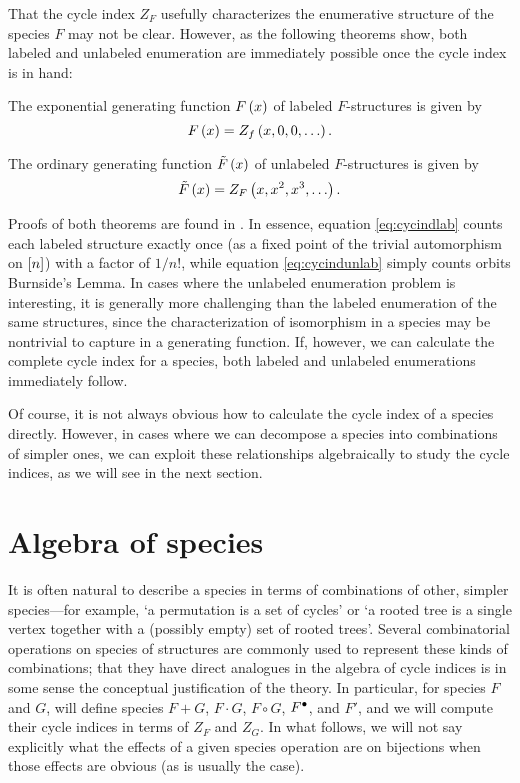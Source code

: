 \documentclass[sectionflow,singlespace,twoside,boldmathhdr]{brandiss} %
\numberwithin{section}{chapter}
\numberwithin{figure}{chapter}
\begin{document}
That the cycle index $Z_{F}$ usefully characterizes the enumerative structure of the species $F$ may not be clear.
However, as the following theorems show, both labeled and unlabeled enumeration are immediately possible once the cycle index is in hand:
\begin{theorem}\label{thm:cycindlab}
  The exponential generating function $F \left( {x} \right)$ of labeled $F$-structures is given by
  \begin{equation}\label{eq:cycindlab}
    F \left( {x} \right) = Z_{f} \left( {x, 0, 0, \dots} \right).
  \end{equation}
\end{theorem}
\begin{theorem}\label{thm:cycindunlab}
  The ordinary generating function $\tilde{F} \left( {x} \right)$ of unlabeled $F$-structures is given by
  \begin{equation}\label{eq:cycindunlab}
    \tilde{F} \left( {x} \right) = Z_{F} \left( {x, x^{2}, x^{3}, \dots} \right).
  \end{equation}
\end{theorem}
Proofs of both theorems are found in \cite[\S 1.2]{bll:species}.
In essence, equation \eqref{eq:cycindlab} counts each labeled structure exactly once (as a fixed point of the trivial automorphism on $\left[ {n} \right]$) with a factor of $1/n!$, while equation \eqref{eq:cycindunlab} simply counts orbits  Burnside's Lemma.
In cases where the unlabeled enumeration problem is interesting, it is generally more challenging than the labeled enumeration of the same structures, since the characterization of isomorphism in a species may be nontrivial to capture in a generating function.
If, however, we can calculate the complete cycle index for a species, both labeled and unlabeled enumerations immediately follow.

Of course, it is not always obvious how to calculate the cycle index of a species directly.
However, in cases where we can decompose a species into combinations of simpler ones, we can exploit these relationships algebraically to study the cycle indices, as we will see in the next section.

\section{Algebra of species}\label{s:specalg}
It is often natural to describe a species in terms of combinations of other, simpler species---for example, `a permutation is a set of cycles' or `a rooted tree is a single vertex together with a (possibly empty) set of rooted trees'.
Several combinatorial operations on species of structures are commonly used to represent these kinds of combinations; that they have direct analogues in the algebra of cycle indices is in some sense the conceptual justification of the theory.
In particular, for species $F$ and $G$, will define species $F + G$, $F \cdot G$, $F \circ G$, ${F}^{\bullet }$, and $F'$, and we will compute their cycle indices in terms of $Z_{F}$ and $Z_{G}$.
In what follows, we will not say explicitly what the effects of a given species operation are on bijections when those effects are obvious (as is usually the case).
\end{document}
